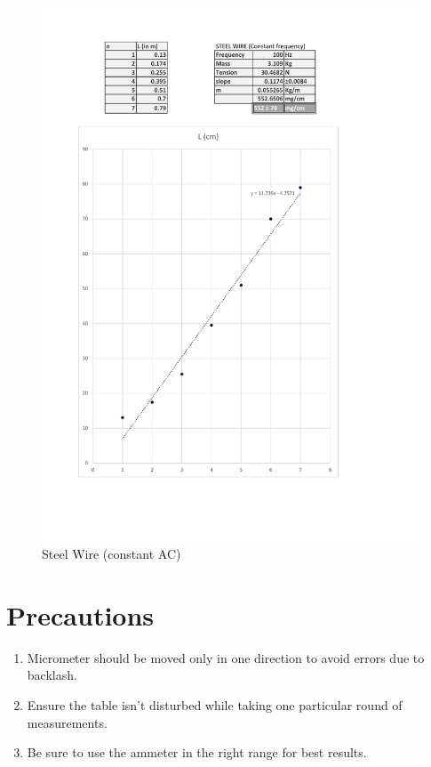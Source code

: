 	\begin{figure}[bth]
		\begin{center}
			\includegraphics[width=1.3\linewidth]{gfx/steel_2}
		\end{center}
		\caption[Steel Wire (constant AC)]{Steel Wire (constant AC)}
	\label{4_steel2}
	\end{figure}

	
\section{Precautions}
	\begin{enumerate}		
		\item Micrometer should be moved only in one direction to avoid errors due to backlash.
		\item Ensure the table isn't disturbed while taking one particular round of measurements.
		\item Be sure to use the ammeter in the right range for best results.
	\end{enumerate}